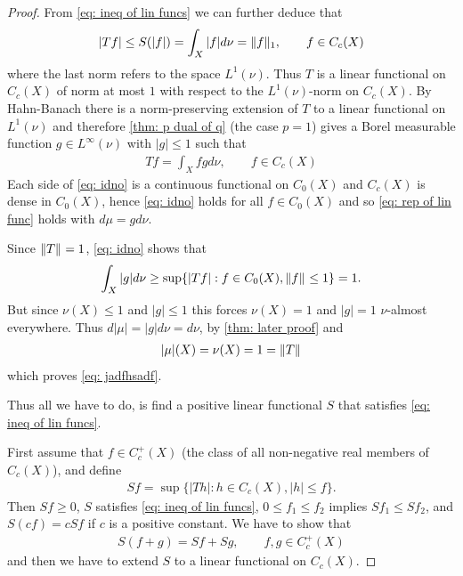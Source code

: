 \begin{proof}
From \eqref{eq: ineq of lin funcs} we can further deduce that
\begin{align*}
	|Tf| \le S(|f|) = \int_{X} |f| d\nu = \norm[1]{f}, \qquad f\in C_{c}(X)
\end{align*}
where the last norm refers to the space $L^{1}(\nu)$. Thus $T$ is a linear functional on $C_{c}(X)$ of norm at most $1$ with respect to the $L^{1}(\nu)$-norm on $C_{c}(X)$. By Hahn-Banach there is a norm-preserving extension of $T$ to a linear functional on $L^{1}(\nu)$ and therefore \cref{thm: p dual of q} (the case $p=1$) gives a Borel measurable function $g\in L^{\infty}(\nu)$ with $|g| \le 1$ such that
\begin{align}
	Tf=\int_{X}fgd\nu, \qquad f\in C_{c}(X) \label{eq: idno}
\end{align}
Each side of \eqref{eq: idno} is a continuous functional on $C_{0}(X)$ and $C_{c}(X)$ is dense in $C_{0}(X)$, hence \eqref{eq: idno} holds for all $f\in C_{0}(X)$ and so \eqref{eq: rep of lin func} holds with $d\mu=g d\nu$.

Since $\norm{T}=1$, \eqref{eq: idno} shows that
\begin{align*}
	\int_{X} |g| d\nu \ge \sup\{ |Tf| : f\in C_{0}(X), \norm{f} \le 1 \} = 1.
\end{align*}
But since $\nu(X) \le 1$ and $|g| \le 1$ this forces $\nu(X)=1$ and $|g|=1$ $\nu$-almost everywhere. Thus $d|\mu| = |g| d\nu = d\nu$, by \cref{thm: later proof} and
\begin{align*}
	|\mu| (X) = \nu(X) = 1 = \norm{T}
\end{align*}
which proves \eqref{eq: jadfhsadf}.

Thus all we have to do, is find a positive linear functional $S$ that satisfies \eqref{eq: ineq of lin funcs}.

First assume that $f\in C_{c}^{+}(X)$ (the class of all non-negative real members of $C_{c}(X)$), and define
\begin{align*}
	Sf=\sup\{ |Th| : h\in C_{c}(X), |h| \le f \}.
\end{align*}
Then $Sf \ge 0$, $S$ satisfies \eqref{eq: ineq of lin funcs}, $0 \le f_{1} \le f_{2}$ implies $Sf_{1} \le Sf_{2}$, and $S(cf)=cSf$ if $c$ is a positive constant. We have to show that
\begin{align}
	S(f+g)=Sf+Sg, \qquad f,g\in C_{c}^{+}(X) \label{eq: linearity}
\end{align}
and then we have to extend $S$ to a linear functional on $C_{c}(X)$.


\end{proof}
